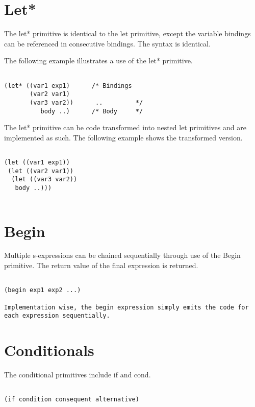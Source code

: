 \documentclass{article}
\begin{document}
\section{Let*}

The let* primitive is identical to the let primitive, except the variable bindings can be referenced in consecutive bindings. The syntax is identical.

The following example illustrates a use of the let* primitive. 

\begin{verbatim}

(let* ((var1 exp1)      /* Bindings
       (var2 var1)     
       (var3 var2))      ..         */
          body ..)      /* Body     */   

\end{verbatim}

The let* primitive can be code transformed into nested let primitives and are implemented as such. The following example shows the transformed version.

\begin{verbatim}

(let ((var1 exp1))
 (let ((var2 var1))
  (let ((var3 var2))
   body ..))) 
 
\end{verbatim}

\section{Begin}

Multiple s-expressions can be chained sequentially through use of the Begin primitive. The return value of the final expression is returned. 

\begin{verbatim}

(begin exp1 exp2 ...) 

Implementation wise, the begin expression simply emits the code for each expression sequentially. 

\end{verbatim}

\section{Conditionals}

The conditional primitives include if and cond. 

\begin{verbatim}

(if condition consequent alternative)

\end{verbatim}
\end{document}
